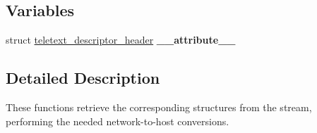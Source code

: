 \subsection*{Variables}
\begin{DoxyCompactItemize}
\item 
struct \hyperlink{structteletext__descriptor__header}{teletext\+\_\+descriptor\+\_\+header} {\bfseries \+\_\+\+\_\+attribute\+\_\+\+\_\+}\hypertarget{group__structure_ga7fb4862380fb668276c4b2941dbf65c3}{}\label{group__structure_ga7fb4862380fb668276c4b2941dbf65c3}

\end{DoxyCompactItemize}


\subsection{Detailed Description}
These functions retrieve the corresponding structures from the stream, performing the needed network-\/to-\/host conversions. 

